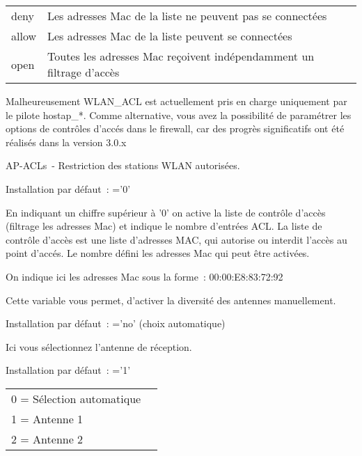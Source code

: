 \begin{description}
        \begin{tabular}[h]{ll}
          deny  & Les adresses Mac de la liste ne peuvent pas se connectées \\
          allow & Les adresses Mac de la liste peuvent se connectées \\
          open  & Toutes les adresses Mac reçoivent indépendamment un filtrage
          d'accès \\
        \end{tabular}

      Malheureusement WLAN\_ACL est actuellement pris en charge uniquement par
      le pilote hostap\_*. Comme alternative, vous avez la possibilité de
      paramétrer les options de contrôles d'accés dans le firewall, car des
      progrès significatifs ont été réalisés dans la version 3.0.x


      AP-ACLs~- Restriction des stations WLAN autorisées.

      Installation par défaut~: ='0'

      En indiquant un chiffre supérieur à '0' on active la liste de contrôle
      d'accès (filtrage les adresses Mac) et indique le nombre d'entrées ACL. La
      liste de contrôle d'accès est une liste d'adresses MAC, qui autorise ou
      interdit l'accès au point d'accés. Le nombre défini les adresses Mac qui
      peut être activées.


      On indique ici les adresses Mac sous la forme~: 00:00:E8:83:72:92


      Cette variable vous permet, d'activer la diversité des antennes manuellement.

      Installation par défaut~: ='no' (choix automatique)


      Ici vous sélectionnez l'antenne de réception.

      Installation par défaut~: ='1'

        \begin{tabular}[h]{ll}
        0 = Sélection automatique\\
        1 = Antenne 1\\
        2 = Antenne 2\\
        \end{tabular}


\end{description}

